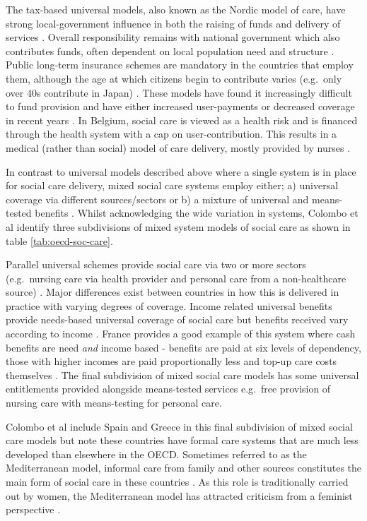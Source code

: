 \documentclass[12pt,]{report}
\begin{document}
The tax-based universal models, also known as the Nordic model of care,
have strong local-government influence in both the raising of funds and
delivery of services \citep{RN414, RN348, RN346, RN349}. Overall
responsibility remains with national government which also contributes
funds, often dependent on local population need and structure
\citep{RN414}. Public long-term insurance schemes are mandatory in the
countries that employ them, although the age at which citizens begin to
contribute varies (e.g.~only over 40s contribute in Japan)
\citep{RN414, RN413, RN407}. These models have found it increasingly
difficult to fund provision and have either increased user-payments or
decreased coverage in recent years \citep{RN345, RN413, RN407}. In
Belgium, social care is viewed as a health risk and is financed through
the health system with a cap on user-contribution. This results in a
medical (rather than social) model of care delivery, mostly provided by
nurses \citep{RN414}.

In contrast to universal models described above where a single system is
in place for social care delivery, mixed social care systems employ
either; a) universal coverage via different sources/sectors or b) a
mixture of universal and means-tested benefits \citep{RN414}. Whilst
acknowledging the wide variation in systems, Colombo et al
\citeyearpar{RN414} identify three subdivisions of mixed system models
of social care as shown in table \ref{tab:oecd-soc-care}.

Parallel universal schemes provide social care via two or more sectors
(e.g.~nursing care via health provider and personal care from a
non-healthcare source) \citep{RN414}. Major differences exist between
countries in how this is delivered in practice with varying degrees of
coverage. Income related universal benefits provide needs-based
universal coverage of social care but benefits received vary according
to income \citep{RN414}. France provides a good example of this system
where cash benefits are need \textit{and} income based - benefits are
paid at six levels of dependency, those with higher incomes are paid
proportionally less and top-up care costs themselves
\citep{RN414, RN420}. The final subdivision of mixed social care models
has some universal entitlements provided alongside means-tested services
e.g.~free provision of nursing care with means-testing for personal
care.

Colombo et al \citeyearpar{RN414} include Spain and Greece in this final
subdivision of mixed social care models but note these countries have
formal care systems that are much less developed than elsewhere in the
OECD. Sometimes referred to as the Mediterranean model, informal care
from family and other sources constitutes the main form of social care
in these countries \citep{RN348, RN346, RN349}. As this role is
traditionally carried out by women, the Mediterranean model has
attracted criticism from a feminist perspective \citep{RN346}.
\end{document}
